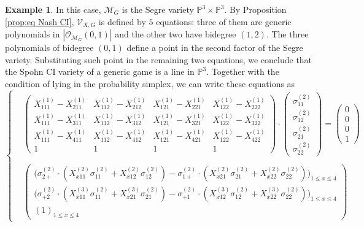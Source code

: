 \documentclass[11pt]{amsart}
\numberwithin{equation}{section}
\theoremstyle{plain}
\numberwithin{theorem}{section}
\theoremstyle{definition}
\newtheorem{example}[theorem]{Example}
\newcommand{\PP}{{\mathbb P}}
\newcommand{\Vc}{{\mathcal V}_{X,G}}
\begin{document}
\begin{example}
In this case, $\mathcal M_G$ is the Segre variety $\PP^3\times\PP^3$. By Proposition \ref{prop:eq Nash CI}, $\Vc$ is defined by $5$ equations: three of them are generic polynomials in $|\mathcal{O}_{\mathcal M_G}(0,1)|$  and the other two have bidegree $(1,2)$. The three polynomials of bidegree $(0,1)$ define a point in the second factor of the Segre variety. Substituting such point in the remaining two equations, we conclude that the Spohn CI variety of a generic game is a line in $\PP^3$. Together with the condition of lying in the probability simplex, we can write these equations as
\begin{equation*}
\left\{\begin{array}{cc}
     & \begin{pmatrix}
    X_{111}^{(1)}-X_{211}^{(1)} & X_{112}^{(1)}-X_{212}^{(1)} & X_{121}^{(1)}-X_{221}^{(1)} & X_{122}^{(1)}-X_{222}^{(1)} \\
    X_{111}^{(1)}-X_{311}^{(1)} & X_{112}^{(1)}-X_{312}^{(1)} & X_{121}^{(1)}-X_{321}^{(1)} & X_{122}^{(1)}-X_{322}^{(1)} \\
    X_{111}^{(1)}-X_{411}^{(1)} & X_{112}^{(1)}-X_{412}^{(1)} & X_{121}^{(1)}-X_{421}^{(1)} & X_{122}^{(1)}-X_{422}^{(1)} \\
    1 & 1 & 1 & 1
\end{pmatrix}\cdot\begin{pmatrix}
    \sigma_{11}^{(2)}\\
    \sigma_{12}^{(2)}\\
    \sigma_{21}^{(2)}\\
    \sigma_{22}^{(2)}
\end{pmatrix}=\begin{pmatrix}
    0\\
    0\\
    0\\
    1
\end{pmatrix} \\
    & \\
     & \begin{pmatrix}
        \big(\sigma_{2+}^{(2)}\cdot(X^{(2)}_{x11}\sigma_{11}^{(2)}+X^{(2)}_{x12}\sigma_{12}^{(2)})-\sigma_{1+}^{(2)}\cdot(X^{(2)}_{x21}\sigma_{21}^{(2)}+X^{(2)}_{x22}\sigma_{22}^{(2)})\big)_{1\le x\le4}\\
        \big(\sigma_{+2}^{(2)}\cdot(X^{(3)}_{x11}\sigma_{11}^{(2)}+X^{(3)}_{x21}\sigma_{21}^{(2)})-\sigma_{+1}^{(2)}\cdot(X^{(3)}_{x12}\sigma_{12}^{(2)}+X^{(3)}_{x22}\sigma_{22}^{(2)})\big)_{1\le x\le4}\\
        (1)_{1\le x\le4}

\end{pmatrix}
\end{array}
\end{equation*}
\end{example}
\end{document}
